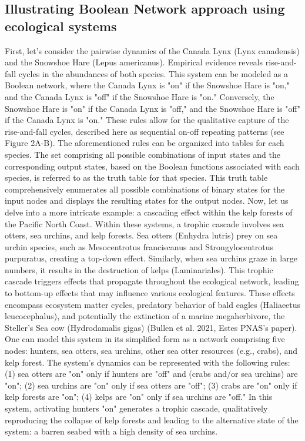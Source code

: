 \documentclass[10pt]{article}
\begin{document}
\subsection{Illustrating Boolean Network approach using ecological systems} 
	First, let's consider the pairwise dynamics of the Canada Lynx (Lynx canadensis) and the Snowshoe Hare (Lepus americanus). Empirical evidence reveals rise-and-fall cycles in the abundances of both species. This system can be modeled as a Boolean network, where the Canada Lynx is "on" if the Snowshoe Hare is "on," and the Canada Lynx is "off" if the Snowshoe Hare is "on." Conversely, the Snowshoe Hare is "on" if the Canada Lynx is "off," and the Snowshoe Hare is "off" if the Canada Lynx is "on." These rules allow for the qualitative capture of the rise-and-fall cycles, described here as sequential on-off repeating patterns (see Figure 2A-B). The aforementioned rules can be organized into tables for each species. The set comprising all possible combinations of input states and the corresponding output states, based on the Boolean functions associated with each species, is referred to as the truth table for that species. This truth table comprehensively enumerates all possible combinations of binary states for the input nodes and displays the resulting states for the output nodes.
	Now, let us delve into a more intricate example: a cascading effect within the kelp forests of the Pacific North Coast. Within these systems, a trophic cascade involves sea otters, sea urchins, and kelp forests. Sea otters (Enhydra lutris) prey on sea urchin species, such as Mesocentrotus franciscanus and Strongylocentrotus purpuratus, creating a top-down effect. Similarly, when sea urchins graze in large numbers, it results in the destruction of kelps (Laminariales). This trophic cascade triggers effects that propagate throughout the ecological network, leading to bottom-up effects that may influence various ecological features. These effects encompass ecosystem matter cycles, predatory behavior of bald eagles (Haliaeetus leucocephalus), and potentially the extinction of a marine megaherbivore, the Steller’s Sea cow (Hydrodamalis gigas) (Bullen et al. 2021, Estes PNAS’s paper). 
	One can model this system in its simplified form as a network comprising five nodes: hunters, sea otters, sea urchins, other sea otter resources (e.g., crabs), and kelp forest. The system’s dynamics can be represented with the following rules: (1) sea otters are "on" only if hunters are "off" and (crabs and/or sea urchins) are "on"; (2) sea urchins are "on" only if sea otters are "off"; (3) crabs are "on" only if kelp forests are "on"; (4) kelps are "on" only if sea urchins are "off." In this system, activating hunters "on" generates a trophic cascade, qualitatively reproducing the collapse of kelp forests and leading to the alternative state of the system: a barren seabed with a high density of sea urchins. 
\end{document}
